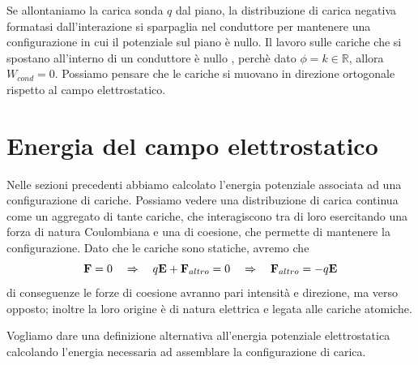 Se allontaniamo la carica sonda $q$ dal piano, la distribuzione di carica negativa formatasi dall'interazione si sparpaglia nel conduttore per mantenere una configurazione in cui il potenziale sul piano \`e nullo. Il lavoro sulle cariche che si spostano all'interno di un conduttore \`e nullo , perch\`e dato $\phi = k \in \mathbb{R}$, allora $W_{cond} = 0$. Possiamo pensare che le cariche si muovano in direzione ortogonale rispetto al campo elettrostatico.


\section{Energia del campo elettrostatico}

Nelle sezioni precedenti abbiamo calcolato l'energia potenziale associata ad una configurazione di cariche. Possiamo vedere una distribuzione di carica continua come un aggregato di tante cariche, che interagiscono tra di loro esercitando una forza di natura Coulombiana e una di coesione, che permette di mantenere la configurazione. Dato che le cariche sono statiche, avremo che 
\begin{equation*}
	\bold{F} = 0 \quad \Rightarrow  \quad q\bold{E} + \bold{F}_{altro} = 0 \quad  \Rightarrow  \quad \bold{F}_{altro} =-q \bold{E}
\end{equation*} 
di conseguenze le forze di coesione avranno pari intensit\`a e direzione, ma verso opposto; inoltre la loro origine \`e di natura elettrica e legata alle cariche atomiche.

Vogliamo dare una definizione alternativa all'energia potenziale elettrostatica calcolando l'energia necessaria ad assemblare la configurazione di carica. 
\newline


